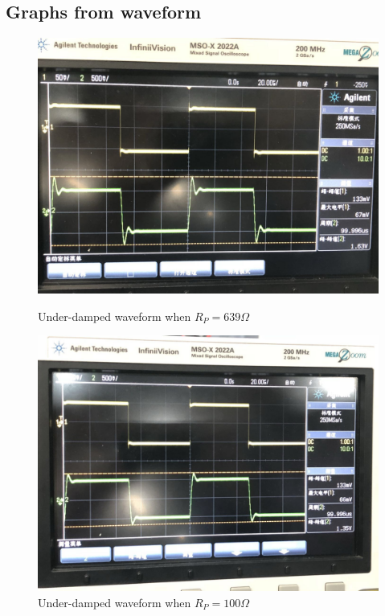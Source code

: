 \documentclass[12pt]{article}
\begin{document}
\subsection{Graphs from waveform}
\begin{figure}[H]
\centering
\includegraphics[scale=0.2]{P1.jpg}
\caption{Under-damped waveform when $R_P=639\Omega$}
\includegraphics[scale=0.2]{P2.jpg}
\caption{Under-damped waveform when $R_P=100\Omega$}
\end{figure}
\end{document}
